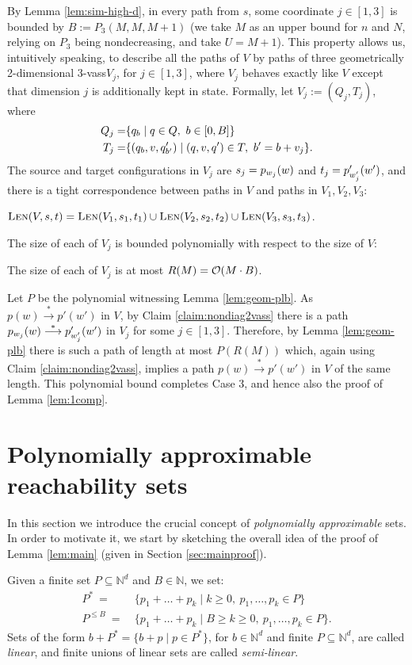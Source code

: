 \documentclass[a4paper, UKenglish, cleveref, autoref, thm-restate]{lipics-v2021}
\newcommand{\Sandwich}{Polynomially approximable\xspace}
\newcommand{\sandwich}{polynomially approximable\xspace}
\newcommand{\N}{\mathbb{N}}
\newcommand{\set}[1]{\{#1\}}
\newcommand{\setof}[2]{\set{#1 \mid #2}}
\newcommand{\trans}[1]{\stackrel{#1}{\longrightarrow}}
\newcommand{\tran}{\trans{*}}
\newcommand{\Len}[3]{\textsc{Len}(#1, #2, #3)}
\newcommand{\OO}{{\cal O}}
\newcommand{\vass}{{\sc vass}\xspace}
\newcommand{\tvass}{\parvass 3}
\newcommand{\geomvass}{geometrically 2-dimensional \tvass}
\newcommand{\parvass}[1]{{$#1$-\vass}\xspace}
\newcommand{\setfromto}[2]{[#1, #2]}
\newcommand{\setto}[1]{\setfromto 1 {#1}}
\begin{document}
By Lemma \ref{lem:sim-high-d},
in every path from $s$, some coordinate
$j\in\setto 3$ is bounded by $B:=P_3(M, M, M+1)$ (we take $M$ as an upper bound for $n$ and $N$,
relying on $P_3$ being nondecreasing, and take $U=M+1$).
This property allows us, intuitively speaking, to describe all the paths of $V$ by paths of three
\geomvass $V_j$, for $j\in\setto 3$, where $V_j$ behaves exactly like $V$ except that dimension $j$ is additionally kept in state.
Formally, let $V_j := (Q_j, T_j)$, where 
\begin{align*}
Q_j = & \setof{\pair q b}{q\in Q, \ b \in \setfromto 0 B} \\
T_j =  & \setof{(\pair q b, v, \pair {q'}{b'})}{(q, v, q')\in T, \ b' = b + v_j}.
\end{align*}
The source and target configurations in $V_j$ are $s_j = p_{w_j}(w)$ and $t_j = p'_{w'_j}(w')$,
and there is a tight correspondence between paths in $V$ and paths in $V_1, V_2, V_3$:
\begin{claim} \label{claim:nondiag2vass}
$\Len V s t = \Len {V_1} {s_1} {t_1} \cup \Len {V_2} {s_2} {t_2} \cup \Len {V_3} {s_3} {t_3}$.
\end{claim}
The size of each of $V_j$ is bounded polynomially with respect to the size of $V$:
\begin{claim} \label{claim:nondiagsize}
The size of each of $V_j$ is at most $R(M)=\OO(M\cdot B)$.
\end{claim}
Let $P$ be the polynomial witnessing Lemma \ref{lem:geom-plb}.
As $p(w) \tran p'(w')$ in $V$,
by Claim \ref{claim:nondiag2vass}
there is a path $\pair p {w_j}(w) \tran \pair{p'}{w'_j}({w'})$ in $V_j$
for some $j\in\setto 3$.
Therefore, by Lemma \ref{lem:geom-plb} there is such a path of length 
at most $P(R(M))$ which,
again using Claim \ref{claim:nondiag2vass}, implies a path $p(w) \tran p'(w')$ in $V$ of the same length.
This polynomial bound completes Case 3, and hence also the proof of
Lemma \ref{lem:1comp}.
 

\section{\Sandwich reachability sets} \label{sec:tools}
In this section we introduce the crucial concept of \emph{\sandwich} sets.
In order to motivate it, we start by sketching the overall idea of the
proof of Lemma \ref{lem:main} (given in Section \ref{sec:mainproof}). 

Given a finite set $P\subseteq \N^d$ and $B\in\N$, we set:
\begin{align*}
P^* \ =  \ & \setof{p_1 + \ldots + p_k}{k\geq 0, \ p_1, \ldots, p_k \in P} \\
P^{\leq B} \ =  \ & \setof{p_1 + \ldots + p_k}{B\geq k\geq 0, \ p_1, \ldots, p_k \in P}.
\end{align*}
Sets of the form $b + P^* = \setof{b+p}{p\in P^*}$, for $b\in\N^d$ and finite $P\subseteq\N^d$,
are called \emph{linear},
and finite unions of linear sets are called \emph{semi-linear}.
\end{document}
